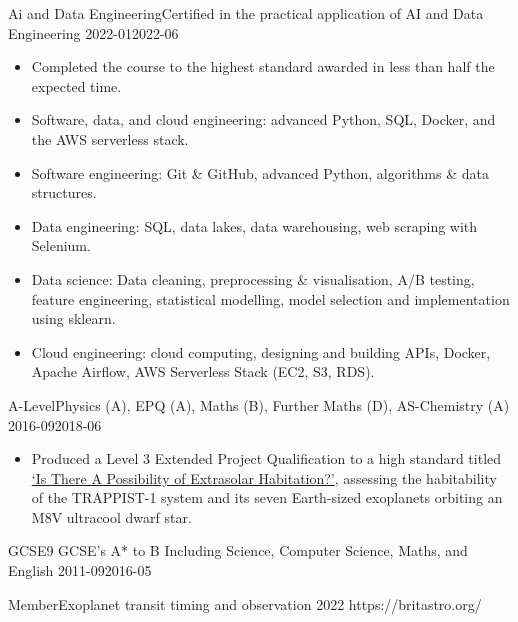 {Ai and Data Engineering}{Certified in the practical application of AI and Data Engineering}
{2022-01}{2022-06}
{%
\begin{itemize}[leftmargin=*, labelsep=-0.1em, noitemsep]
    \item Completed the course to the highest standard awarded in less than half the expected time.
\iflean
    \item Software, data, and cloud engineering: advanced Python, SQL, Docker, and the AWS serverless stack.
\else
    \item Software engineering: Git \& GitHub, advanced Python, algorithms \& data structures.
    \item Data engineering: SQL, data lakes, data warehousing, web scraping with Selenium.
    \item Data science: Data cleaning, preprocessing \& visualisation, A/B testing, feature engineering, statistical modelling, model selection and implementation using sklearn.
    \item Cloud engineering: cloud computing, designing and building APIs, Docker, Apache Airflow, AWS Serverless Stack (EC2, S3, RDS).
\fi
\end{itemize}
}

\ifshowextra
{}
{A-Level}{Physics (A), EPQ (A), Maths (B), Further Maths (D), AS-Chemistry (A)}
{2016-09}{2018-06}
{%
\begin{itemize}[leftmargin=*, labelsep=-0.1em, noitemsep]
    \item Produced a Level 3 Extended Project Qualification to a high standard titled \href{https://skyecas.github.io/assets/pdf/EPQ.pdf}{`Is There A Possibility of Extrasolar Habitation?'}, assessing the habitability of the TRAPPIST-1 system and its seven Earth-sized exoplanets orbiting an M8V ultracool dwarf star.
\end{itemize}
}
\fi

\iflean\else
{}
{GCSE}{9 GCSE's A* to B Including Science, Computer Science, Maths, and English}
{2011-09}{2016-05}
{}
\fi


\ifshowextra
{}
{Member}{Exoplanet transit timing and observation}
{2022}{}
{}
{https://britastro.org/}
\fi

